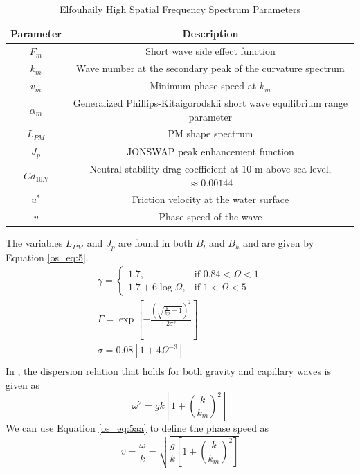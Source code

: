\begin{table}[H]
  \begin{center}
      \renewcommand{\baselinestretch}{1} \small\normalsize
  \begin{quote}
    \caption[Elfouhaily High Spatial Frequency Spectrum Parameters]{Elfouhaily High Spatial Frequency Spectrum Parameters\label{os_tab:2}}
  \end{quote}
  \begin{tabular} {|c | c |}
    \hline
  \bf{Parameter} & \bf{Description} \\ \hline
  $F_m$ & Short wave side effect function \\ \hline
  $k_m$ &  Wave number at the secondary peak of the curvature spectrum \\ \hline
  $v_m$ &  Minimum phase speed at $k_m$ \\ \hline
  $\alpha_m$ & Generalized Phillips-Kitaigorodskii short wave equilibrium range parameter \\ \hline
  $L_{PM}$ & PM shape spectrum \\ \hline
  $J_p$ & JONSWAP peak enhancement function \\ \hline
  $Cd_{10N}$ & Neutral stability drag coefficient at $10$ m above sea level, $\approx 0.00144$ \\ \hline
  $u^*$ & Friction velocity at the water surface \\ \hline
  $v$ & Phase speed of the wave \\ \hline
\end{tabular}
\end{center}
\end{table}
\renewcommand{\baselinestretch}{2} \small\normalsize
The variables $L_{PM}$ and $J_p$ are found in both $B_l$ and $B_h$ and are given by Equation \ref{os_eq:5}.
\begin{equation}
\begin{gathered}
  \label{os_eq:5}
    \gamma = \begin{cases}
    1.7,& \text{if } 0.84 < \Omega < 1\\
    1.7 + 6\log{\Omega}, & \text{if } 1 < \Omega < 5
  \end{cases} \\
  \Gamma = \exp{\left[- \frac{\left(\sqrt{\frac{k}{kp} - 1} \right)^2}{2\sigma^2} \right]} \\
  \sigma = 0.08\left[1 + 4\Omega^{-3} \right] \\
\end{gathered}
\end{equation}
\renewcommand{\baselinestretch}{2} \small\normalsize
In \cite{elfouhaily}, the dispersion relation that holds for both gravity and capillary waves is given as 
\begin{equation}
\label{os_eq:5aa}
\omega^2 = gk\left[1 + \left(\frac{k}{k_m}\right)^2 \right]
\end{equation}
We can use Equation \ref{os_eq:5aa} to define the phase speed as
\begin{equation}
\label{os_eq:5ab}
v = \frac{\omega}{k}= \sqrt{\frac{g}{k}\left[1 + \left(\frac{k}{k_m}\right)^2 \right]}
\end{equation}

